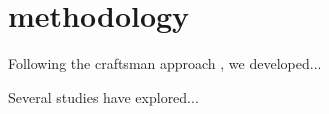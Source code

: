 \chapter{methodology}
\label{ch:methodology}

Following the craftsman approach \cite{sennett2009craftsman}, we developed...


Several studies \cite{gershenfeld2017designing,beech2019art,latour2005reassembling} have explored...